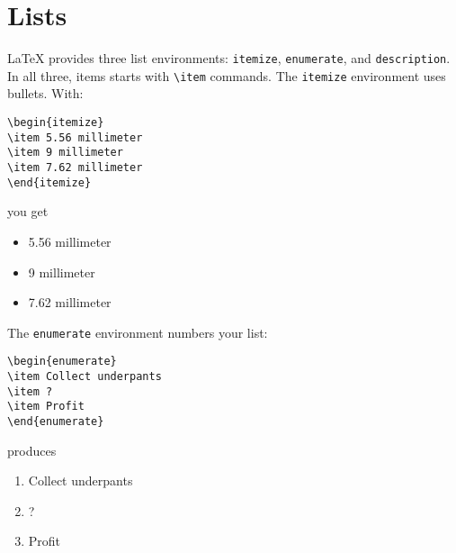 \section{Lists}

\LaTeX{} provides three list environments:
\texttt{itemize}, \texttt{enumerate}, and \texttt{description}.
In all three, items starts with \verb|\item| commands.
The \texttt{itemize} environment uses bullets.
With:
\begin{leftfigure}
\begin{lstlisting}
\begin{itemize}
\item 5.56 millimeter
\item 9 millimeter
\item 7.62 millimeter
\end{itemize}
\end{lstlisting}
\end{leftfigure}
you get
\begin{leftfigure}
\lm%
\begin{itemize}[leftmargin=*]
\item 5.56 millimeter
\item 9 millimeter
\item 7.62 millimeter
\end{itemize}
\end{leftfigure}

\bigskip
\noindent The \texttt{enumerate} environment numbers your list:
\begin{leftfigure}
\begin{lstlisting}
\begin{enumerate}
\item Collect underpants
\item ?
\item Profit
\end{enumerate}
\end{lstlisting}
\end{leftfigure}
produces
\begin{leftfigure}
\lm%
\begin{enumerate}[leftmargin=*]
\item Collect underpants
\item ?
\item Profit
\end{enumerate}
\end{leftfigure}

